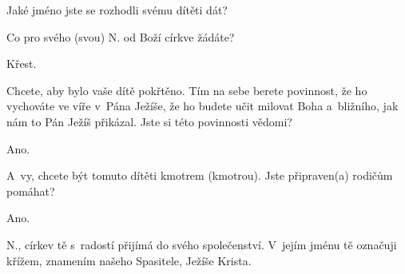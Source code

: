 
Jaké jméno jste se rozhodli svému dítěti dát?


 Co pro svého (svou) {\color{red}N.} od Boží církve žádáte?

 Křest.

 Chcete, aby bylo vaše dítě pokřtěno. Tím na sebe berete
povinnost, že ho vychováte ve víře v~Pána Ježíše, že ho budete učit milovat
Boha a~bližního, jak nám to Pán Ježíš přikázal. Jste si této povinnosti
vědomi?

 Ano.

 A~vy, chcete být tomuto dítěti kmotrem (kmotrou). Jste připraven(a)
rodičům pomáhat?

 Ano.

 {\color{red}N.}, církev tě s~radostí přijímá do svého
společenství. V~jejím jménu tě označuji křížem, znamením našeho Spasitele,
Ježíše Krista.

